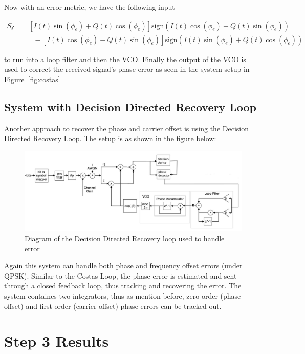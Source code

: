 \documentclass[]{article}
\begin{document}
Now with an error metric, we have the following input 

\begin{align}
  \label{eq:costas}
  S_{\mathcal{l}} &= \left[I\left(t\right)\sin\left(\phi_e\right)+Q\left(t\right)\cos\left(\phi_e\right)\right]\text{sign}\left(I\left(t\right)\cos\left(\phi_e\right)- Q\left(t\right)\sin\left(\phi_e\right)\right)\nonumber \\
  &\qquad {} - \left[I\left(t\right)\cos\left(\phi_e\right)-Q\left(t\right)\sin\left(\phi_e\right)\right]\text{sign}\left(I\left(t\right)\sin\left(\phi_e\right)+Q\left(t\right)\cos\left(\phi_e\right)\right)
  \end{align}


to run into a loop filter and then the VCO. Finally the output of the VCO is used to correct the received signal's phase error as seen in the system setup in Figure~\ref{fig:costas}


\subsection{System with Decision Directed Recovery Loop}
Another approach to recover the phase and carrier offset is using the Decision Directed Recovery Loop. The setup is as shown in the figure below:
\begin{figure}[H]
\centering
\includegraphics[width=\textwidth]{ddr_diagram.jpg}
\caption{Diagram of the Decision Directed Recovery loop used to handle error}
\end{figure}

Again this system can handle both phase and frequency offset errors (under QPSK). Similar to the Costas Loop, the phase error is estimated and sent through a closed feedback loop, thus tracking and recovering the error. The system containes two integrators, thus as mention before, zero order (phase offset) and first order (carrier offset) phase errors can be tracked out. 

\newpage
\section{Step 3 Results}
\end{document}
